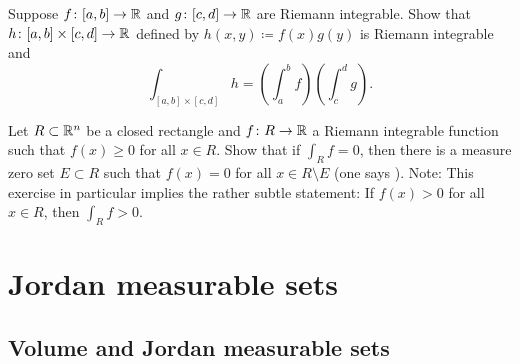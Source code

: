 \begin{exercise}
Suppose $f \colon [a,b] \to {\mathbb{R}}$ and $g \colon [c,d] \to {\mathbb{R}}$ are Riemann integrable.
Show that $h \colon [a,b] \times [c,d] \to {\mathbb{R}}$ defined by $h(x,y) \coloneqq
f(x) g(y)$ is Riemann integrable and
\begin{equation*}
\int_{[a,b] \times [c,d]} h =
\left( \int_a^b f \right)
\left( \int_c^d g \right) .
\end{equation*}
\end{exercise}

\begin{exercise}
Let $R \subset {\mathbb{R}}^n$ be a closed rectangle and $f \colon R \to {\mathbb{R}}$ a
Riemann integrable function such that $f(x) \geq 0$ for all $x \in R$.
Show that if $\int_R f = 0$, then there is a measure zero set $E \subset R$ such that
$f(x) = 0$ for all $x \in R \setminus E$
(one says ).
Note: This exercise in particular implies the rather subtle statement: If $f(x) > 0$
for all $x \in R$, then $\int_R f > 0$.
\end{exercise}



\sectionnewpage
\section{Jordan measurable sets}
\label{sec:jordansets}



\subsection{Volume and Jordan measurable sets}

